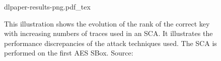 \documentclass[journal]{IEEEtran}
\begin{document}
\begin{figure}[ht]
	\centering
	\def\svgwidth{\columnwidth}
	{dlpaper-results-png.pdf_tex}
	\caption[Performance comparison of SCA techniques used on the AES]{This illustration shows the evolution of the rank of the correct key with increasing numbers of traces used in an SCA. It illustrates the performance discrepancies of the attack techniques used. The SCA is performed on the first AES SBox. Source: \cite[p.~16]{breaking-crypto-dl:prouff}}
	\label{fig:dlpaper-results}
\end{figure}

%
%

%
%
\end{document}
